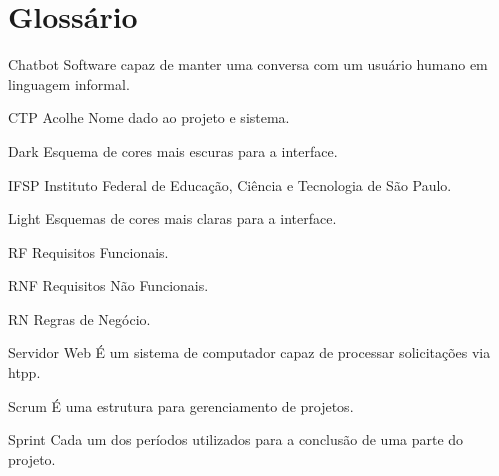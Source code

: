 \documentclass[12pt,a4paper]{article}
\begin{document}
\newpage

\section{Glossário}
\begin{center}
\justifying
    Chatbot 
        Software capaz de manter uma conversa com um usuário humano em linguagem informal. 
\end{center}

\begin{center}
\justifying
    CTP Acolhe 
        Nome dado ao projeto e sistema. 
\end{center}

\begin{center}
\justifying
    Dark
        Esquema de cores mais escuras para a interface. 
\end{center}

\begin{center}
\justifying
    IFSP
        Instituto Federal de Educação, Ciência e Tecnologia de São Paulo. 
\end{center}

\begin{center}
\justifying
    Light
        Esquemas de cores mais claras para a interface.
\end{center}

\begin{center}
\justifying
    RF
        Requisitos Funcionais.
\end{center}

\begin{center}
\justifying
    RNF 
        Requisitos Não Funcionais. 
\end{center}

\begin{center}
\justifying
    RN 
        Regras de Negócio. 
\end{center}

\begin{center}
\justifying
    Servidor Web
        É um sistema de computador capaz de processar solicitações via htpp. 
\end{center}

\begin{center}
\justifying
    Scrum 
        É uma estrutura para gerenciamento de projetos. 
\end{center}

\begin{center}
\justifying
    Sprint
        Cada um dos períodos utilizados para a conclusão de uma parte do projeto. 
\end{center}
\end{document}
